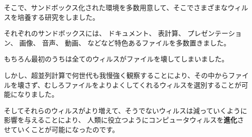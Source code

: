 \documentclass[12pt, unicode]{beamer}
\begin{document}
\begin{frame}

そこで、サンドボックス化された環境を多数用意して、そこでさまざまなウィルスを培養する研究をしました。

それぞれのサンドボックスには、
ドキュメント、
表計算、
プレゼンテーション、
画像、
音声、
動画、
などなど特色あるファイルを多数置きました。

\end{frame}
\begin{frame}

もちろん最初のうちは全てのウィルスがファイルを壊してしまいました。

しかし、超並列計算で何世代も我慢強く観察することにより、その中からファイルを壊さず、むしろファイルをよりよくしてくれるウィルスを選別することが可能になりました。

そしてそれらのウィルスがより増えて、そうでないウィルスは減っていくように影響を与えることにより、
人類に役立つようにコンピュータウィルスを\textbf{進化}させていくことが可能になったのです。

\end{frame}
\end{document}
